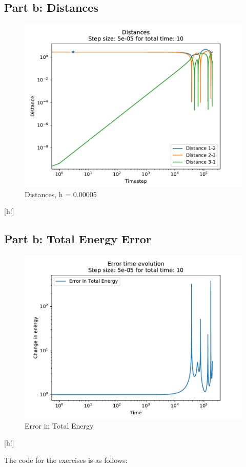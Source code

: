 \documentclass[12pt,a4paper,twoside]{article}
\begin{document}
\subsection*{Part b: Distances}
\begin{figure}[h!]
  \centering
  \includegraphics[]{figs/exercise03_3_stepsize5e-05_time10.pdf}
  \caption{Distances, h = 0.00005}
\end{figure}[h!]

\subsection*{Part b: Total Energy Error}
\begin{figure}[h!]
  \centering
  \includegraphics[]{figs/exercise03_4_stepsize5e-05_time10.pdf}
  \caption{Error in Total Energy}
\end{figure}[h!]

%
The code for the exercises is as follows:
%
%
\end{document}
